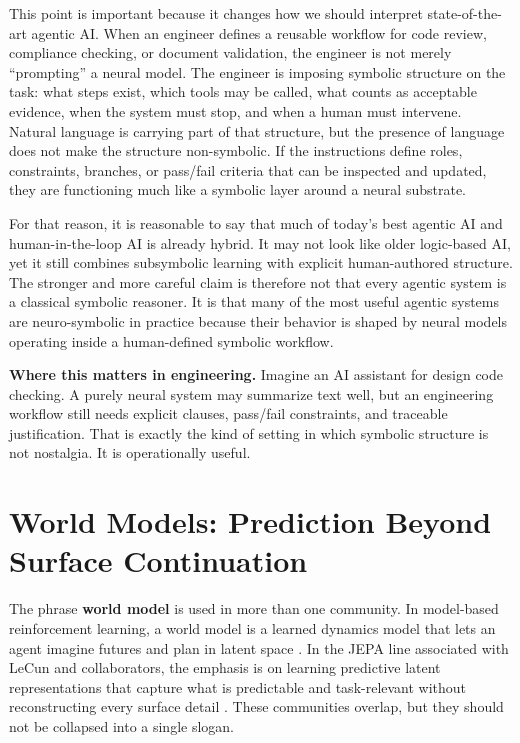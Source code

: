 \documentclass[12pt]{article}
\begin{document}
This point is important because it changes how we should interpret state-of-the-art agentic AI. When an engineer defines a reusable workflow for code review, compliance checking, or document validation, the engineer is not merely ``prompting'' a neural model. The engineer is imposing symbolic structure on the task: what steps exist, which tools may be called, what counts as acceptable evidence, when the system must stop, and when a human must intervene. Natural language is carrying part of that structure, but the presence of language does not make the structure non-symbolic. If the instructions define roles, constraints, branches, or pass/fail criteria that can be inspected and updated, they are functioning much like a symbolic layer around a neural substrate.

For that reason, it is reasonable to say that much of today's best agentic AI and human-in-the-loop AI is already hybrid. It may not look like older logic-based AI, yet it still combines subsymbolic learning with explicit human-authored structure. The stronger and more careful claim is therefore not that every agentic system is a classical symbolic reasoner. It is that many of the most useful agentic systems are neuro-symbolic in practice because their behavior is shaped by neural models operating inside a human-defined symbolic workflow.

\begin{ex-box}
\textbf{Where this matters in engineering.} Imagine an AI assistant for design code checking. A purely neural system may summarize text well, but an engineering workflow still needs explicit clauses, pass/fail constraints, and traceable justification. That is exactly the kind of setting in which symbolic structure is not nostalgia. It is operationally useful.
\end{ex-box}

\section{World Models: Prediction Beyond Surface Continuation}

The phrase \textbf{world model} is used in more than one community. In model-based reinforcement learning, a world model is a learned dynamics model that lets an agent imagine futures and plan in latent space \cite{ha2018worldmodels,hafner2019planet,hafner2020dreamer}. In the JEPA line associated with LeCun and collaborators, the emphasis is on learning predictive latent representations that capture what is predictable and task-relevant without reconstructing every surface detail \cite{lecun2022path,assran2023ijepa}. These communities overlap, but they should not be collapsed into a single slogan.
\end{document}
